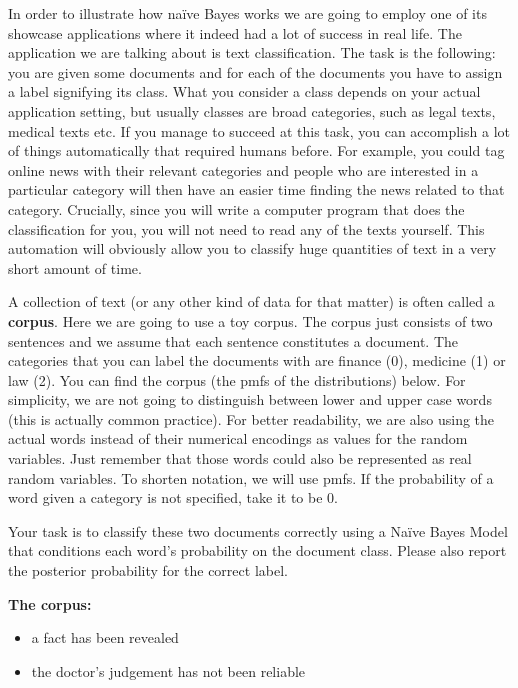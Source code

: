 In order to illustrate how na\"ive Bayes works we are going to employ one of its showcase applications where it indeed had
a lot of success in real life. The application we are talking about is text classification. The task is the following: you
are given some documents and for each of the documents you have to assign a label signifying its class. What you consider
a class depends on your actual application setting, but usually classes are broad categories, such as legal texts, medical
texts etc. If you manage to succeed at this task, you can accomplish a lot of things automatically that required humans before. For example, you could tag online news with their relevant categories and people who are interested in
a particular category will then have an easier time finding the news related to that category. Crucially, since you will
write a computer program that does the classification for you, you will not need to read any of the texts yourself. This automation will obviously allow you to classify huge quantities of text in a very short amount of time.

\begin{Exercise}
A collection of text (or any other kind of data for that matter) is often called a \textbf{corpus}. Here we are going to
use a toy corpus. The corpus just consists of two sentences and we assume that each sentence constitutes
a document.
The categories that you can label the documents with are
finance (0), medicine (1) or law (2). You can find the corpus (the pmfs of the distributions) below. For simplicity, we are not going to distinguish between lower and upper case words (this is actually common practice). For better 
readability, we are also using the actual words instead of their numerical encodings as values for the random 
variables. Just remember that those words could also be represented as real random variables. To shorten notation, we
will use pmfs. If the probability of a word given a category is not specified, take it to be 0.


Your task is to classify these two documents correctly using a Na\"ive Bayes Model that conditions each
word's probability on the document class. Please also report the posterior probability for the correct label. 
\end{Exercise}

\newpage
\textbf{The corpus:}
\begin{itemize}
\item a fact has been revealed
\item the doctor's judgement has not been reliable
\end{itemize}


